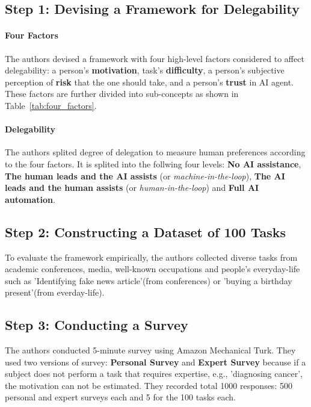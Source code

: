 \documentclass[10pt,twocolumn,letterpaper]{article}
\begin{document}
\subsection{Step 1: Devising a Framework for Delegability}
\paragraph{Four Factors}
The authors devised a framework with four high-level factors considered to affect delegability: a person's \textbf{motivation}, task's \textbf{difficulty}, a person's subjective perception of \textbf{risk} that the one should take, and a person's \textbf{trust} in AI agent. These factors are further divided into sub-concepts as shown in Table~\ref{tab:four_factors}.


\paragraph{Delegability}
The authors splited degree of delegation to measure human preferences according to the four factors. It is splited into the follwing four levels: \textbf{No AI assistance}, \textbf{The human leads and the AI assists} (or \textit{machine-in-the-loop}), \textbf{The AI leads and the human assists} (or \textit{human-in-the-loop}) and \textbf{Full AI automation}.

\subsection{Step 2: Constructing a Dataset of 100 Tasks}
To evaluate the framework empirically, the authors collected diverse tasks from academic conferences, media, well-known occupations and people's everyday-life such as 'Identifying fake news article'(from conferences) or 'buying a birthday present'(from everday-life).


\subsection{Step 3: Conducting a Survey}
The authors conducted 5-minute survey using Amazon Mechanical Turk. They used two versions of survey: \textbf{Personal Survey} and \textbf{Expert Survey} because if a subject does not perform a task that requires expertise, e.g., 'diagnosing cancer', the motivation can not be estimated. They recorded total 1000 responses:  500 personal and expert surveys each and 5 for the 100 tasks each.
\vspace{0.2cm}
\end{document}
